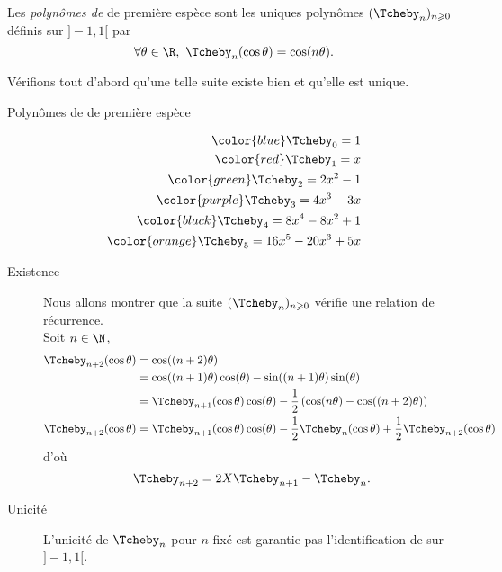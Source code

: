 \begin{defi}
    Les \emph{polynômes de } de première espèce sont les uniques polynômes $(\Tcheby_n)_{n \geqslant 0}$ définis sur $]-1, 1[$ par
    $$\forall \theta \in \R,\ \Tcheby_n (\cos \theta) = \cos(n \theta).$$
\end{defi}

Vérifions tout d'abord qu'une telle suite existe bien et qu'elle est unique.

\begin{marginfigure}[-4.5cm]
    \centering
	
	\caption*{\centering Polynômes de  de première espèce}
	\begin{align*}
	   	\color{blue} \Tcheby_0 = 1 \\
    	\color{red} \Tcheby_1 = x \\
    	\color{green} \Tcheby_2 = 2x^2-1 \\
    	\color{purple} \Tcheby_3 = 4x^3-3x \\
    	\color{black} \Tcheby_4 = 8x^4-8x^2+1 \\
    	\color{orange} \Tcheby_5 = 16x^5-20x^3+5x
	\end{align*}
\end{marginfigure}

\begin{demo}
    \begin{description}
        \item[Existence] Nous allons montrer que la suite $(\Tcheby_n)_{n \geqslant 0}$ vérifie une relation de récurrence. \\
        Soit $n \in \N$,
        \begin{align*}
            \Tcheby_{n+2}(\cos \theta) &= \cos((n+2) \theta) \\
            &= \cos((n+1) \theta) \cos(\theta) - \sin((n+1) \theta) \sin(\theta) \\
            &= \Tcheby_{n+1}(\cos \theta) \cos(\theta) - \frac{1}{2} \left(\cos(n \theta) - \cos((n+2)\theta)\right) \\
            \Tcheby_{n+2}(\cos \theta) &= \Tcheby_{n+1}(\cos \theta) \cos(\theta) - \frac{1}{2} \Tcheby_n(\cos \theta) + \frac{1}{2} \Tcheby_{n+2}(\cos \theta)
        \end{align*}
        d'où
        $$\Tcheby_{n+2} = 2X \Tcheby_{n+1} - \Tcheby_n.$$
        \item[Unicité] L'unicité de $\Tcheby_n$ pour $n$ fixé est garantie pas l'identification de  sur $]-1, 1[$. 
    \end{description}
\end{demo}


